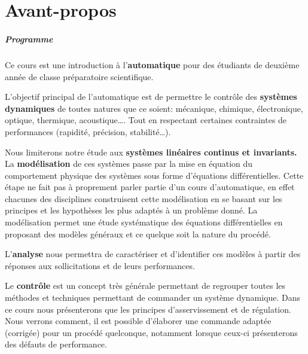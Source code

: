 \chapter*{Avant-propos}

\paragraph{Programme}

Ce cours est une introduction à l'\textbf{automatique}
pour des étudiants de deuxième année de classe préparatoire scientifique.

L'objectif principal de l'automatique est de permettre
le contrôle des \textbf{systèmes dynamiques}
de toutes natures que ce soient: mécanique, chimique, 
électronique, optique, thermique, acoustique\ldots.
Tout en respectant certaines contraintes de performances 
(rapidité, précision, stabilité\ldots).

Nous limiterons notre étude aux \textbf{systèmes linéaires continus et invariants.}
La \textbf{modélisation} de ces systèmes passe par 
la mise en équation du comportement physique des
systèmes sous forme d'équations différentielles.
Cette étape ne fait pas à proprement parler partie d'un cours d'automatique,
en effet chacunes des disciplines construisent cette modélisation 
en se basant sur les principes et les hypothèses les plus adaptés 
à un problème donné.
La modélisation permet une étude systématique des équations
différentielles en proposant des modèles généraux 
et ce quelque soit la nature du procédé.

L'\textbf{analyse} nous permettra de caractériser et d'identifier 
ces modèles à partir des réponses aux sollicitations et de leurs performances.

Le \textbf{contrôle} est un concept très générale permettant de regrouper
toutes les méthodes et techniques permettant de commander un système dynamique.
Dans ce cours nous présenterons que les principes d'asservissement et de régulation.
Nous verrons comment, il est possible d'élaborer une commande adaptée (corrigée) 
pour un procédé quelconque, notamment lorsque ceux-ci présenterons des défauts de performance.



